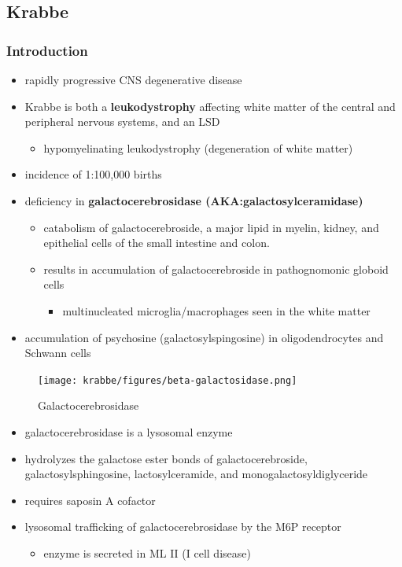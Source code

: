 \documentclass[12pt]{scrartcl}
\begin{document}
\subsection{Krabbe}
\label{sec:orgefd64cf}
\subsubsection{Introduction}
\label{sec:org474271f}
\begin{itemize}
\item rapidly progressive CNS degenerative disease
\item Krabbe is both a \textbf{leukodystrophy} affecting white matter of the central
and peripheral nervous systems, and an LSD
\begin{itemize}
\item hypomyelinating leukodystrophy (degeneration of white matter)
\end{itemize}
\item incidence of 1:100,000 births
\item deficiency in \textbf{galactocerebrosidase (AKA:galactosylceramidase)} 
\begin{itemize}
\item catabolism of galactocerebroside, a major lipid in myelin, kidney, and epithelial cells of the small intestine and colon.
\item results in accumulation of galactocerebroside in pathognomonic globoid cells
\begin{itemize}
\item multinucleated microglia/macrophages seen in the white matter
\end{itemize}
\end{itemize}
\item accumulation of psychosine (galactosylspingosine) in oligodendrocytes and Schwann cells
\end{itemize}

\begin{figure}[htbp]
\centering
\texttt{[image: krabbe/figures/beta-galactosidase.png]}
\caption{\label{fig:org29711c3}Galactocerebrosidase}
\end{figure}

\begin{itemize}
\item galactocerebrosidase is a lysosomal enzyme
\item hydrolyzes the galactose ester bonds of galactocerebroside, galactosylsphingosine, lactosylceramide, and monogalactosyldiglyceride
\item requires saposin A cofactor
\item lysosomal trafficking of galactocerebrosidase by the M6P receptor
\begin{itemize}
\item enzyme is secreted in ML II (I cell disease)
\end{itemize}
\end{itemize}
\end{document}
